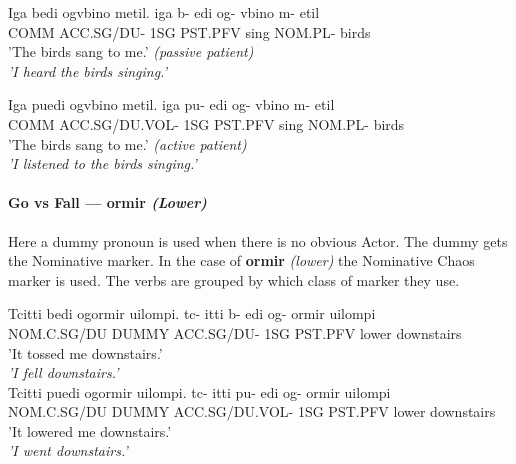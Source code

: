 \documentclass[12pt]{article}
\begin{document}
\begin{exe}
\ex \label{voluntary}
\begin{xlist}
\ex \label{voluntary:invol}
Iga bedi ogvbino metil.
\gll
iga  b-         edi og-     vbino     m-       etil \\
COMM ACC.SG/DU- 1SG PST.PFV sing NOM.PL- birds \\
\trans 
    {\textthin{}'The birds sang to me.' \textit{(passive patient)}}\\
    \textit{'I heard the birds singing.'}

\ex \label{voluntary:vol}
Iga puedi ogvbino metil.
\gll
iga  pu-            edi og-     vbino     m-       etil \\
COMM ACC.SG/DU.VOL- 1SG PST.PFV sing NOM.PL- birds \\
\trans 
    {\textthin{}'The birds sang to me.' \textit{(active patient)}}\\
    \textit{'I listened to the birds singing.'}
\end{xlist}
\end{exe}

\paragraph{Go vs Fall — ormir \textit{(Lower)}}
Here a dummy pronoun is used when there is no obvious Actor.
The dummy gets the Nominative marker.
In the case of \textbf{ormir} \textit{(lower)} the Nominative Chaos marker is used.
The verbs are grouped by which class of marker they use.

\begin{exe}
\ex \label{fall}
\begin{xlist}
\ex \label{fall:invol}
Tcitti bedi ogormir uilompi.
\gll
tc-       itti  b-         edi og-     ormir uilompi\\
NOM.C.SG/DU DUMMY ACC.SG/DU- 1SG PST.PFV lower  downstairs\\
\trans 
    {\textthin{}'It tossed me downstairs.'}\\
    \textit{'I fell downstairs.'}\\

\ex \label{fall:vol}
Tcitti puedi ogormir uilompi.
\gll
tc-       itti  pu-            edi og-     ormir    uilompi\\
NOM.C.SG/DU DUMMY ACC.SG/DU.VOL- 1SG PST.PFV lower downstairs\\
\trans 
    {\textthin{}'It lowered me downstairs.'}\\
    \textit{'I went downstairs.'}\\
\end{xlist}
\end{exe}
\end{document}
